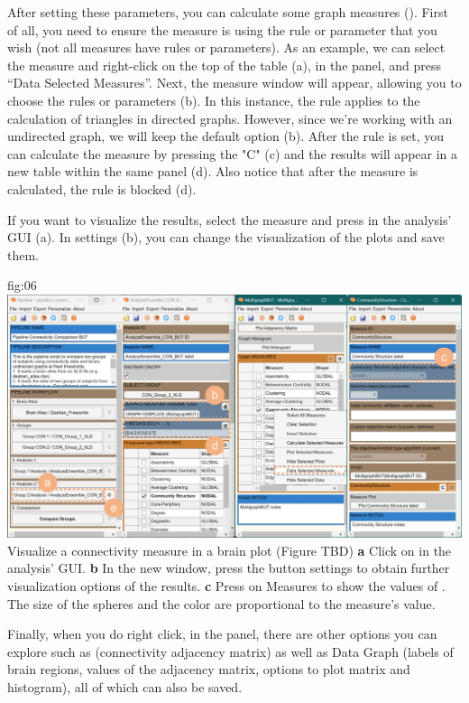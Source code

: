 \documentclass[justified]{tufte-handout}
\begin{document}
 After setting these parameters, you can calculate some graph measures (). First of all, you need to ensure the measure is using the rule or parameter that you wish (not all measures have rules or parameters). As an example, we can select the measure  and right-click on the top of the table (a), in the  panel, and press “Data Selected Measures”. 
 Next, the measure window will appear, allowing you to choose the rules or parameters (b). In this instance, the rule applies to the calculation of triangles in directed graphs. However, since we're working with an undirected graph, we will keep the default option (b).
After the rule is set, you can calculate the measure by pressing the "C" (c) and the results will appear in a new table within the same panel (d). Also notice that after the measure is calculated, the rule is blocked (d).
 
 If you want to visualize the results, select the measure and press  in the analysis' GUI (a). In settings (b), you can change the visualization of the plots and save them. 
 
	{fig:06}
	{
	\includegraphics{fig06.jpg}
	}
	{Visualize a connectivity measure in a brain plot (Figure TBD)}
	{
	{\bf a} Click on  in the analysis' GUI.
        {\bf b} In the new window, press the button settings to obtain further visualization options of the results.
        {\bf c} Press on Measures to show the values of . The size of the spheres and the color are proportional to the measure's value.   
	}
 
 Finally, when you do right click, in the  panel, there are other options you can explore such as  (connectivity adjacency matrix) as well as Data Graph (labels of brain regions, values of the adjacency matrix, options to plot matrix and histogram), all of which can also be saved.
  
\end{document}
